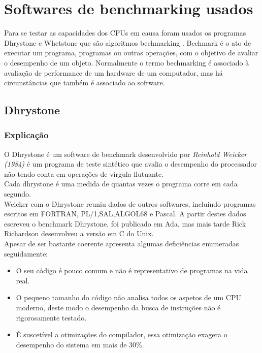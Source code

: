 \documentclass{report}
\begin{document}
\section{Softwares de benchmarking usados}
Para se testar as capacidades dos CPUs em causa foram usados os programas Dhrystone e Whetstone que são algoritmos bechmarking .
Bechmark é o ato de executar um programa, programas ou outras operações, com o objetivo de avaliar o desempenho de um objeto. Normalmente o termo bechmarking é associado à avaliação de performance de um hardware de um computador, mas há circunstâncias que também é associado ao software. 

\subsection{Dhrystone}
\subsubsection{Explicação}
O Dhrystone é um software de benchmark desenvolvido por \textit{Reinhold Weicker (1984)} é um programa de teste sintético que avalia o desempenho do processador não tendo conta em operações de vírgula flutuante.  \\
Cada dhrystone é uma medida de quantas vezes o programa corre em cada segundo.\\
Weicker com o Dhrystone reuniu dados de outros softwares, incluindo programas escritos em FORTRAN, PL/1,SAL,ALGOL68 e Pascal. A partir destes dados escreveu o benchmark Dhrystone, foi publicado em Ada, mas mais tarde Rick Richardson desenvolveu a versão em C do Unix. \\
Apesar de ser bastante coerente apresenta algumas deficiências enumeradas seguidamente:\\
\begin{itemize}
	\item O seu código é pouco comum e não é representativo de programas na vida real.
	\item O pequeno tamanho do código não analisa todos os aspetos de um CPU moderno, deste modo o desempenho da busca de instruções não é rigorosamente testado.
	\item É suscetível a otimizações do compilador, essa otimização exagera o desempenho do sistema em mais de 30\%.
\end{itemize}
\end{document}
